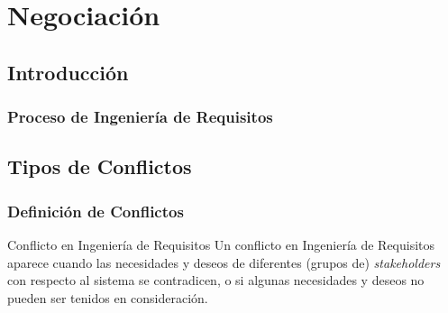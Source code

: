 \documentclass[handout,a4paper,slidestop,xcolor=pst,dvips,blue]{beamer}
\begin{document}
\section{Negociación}

\subsection{Introducción}

\begin{frame}
    \frametitle{Proceso de Ingeniería de Requisitos}
\end{frame}

\subsection{Tipos de Conflictos}

\begin{frame}[c]
    \frametitle{Definición de Conflictos}
    \begin{block}{Conflicto en Ingeniería de Requisitos}
        Un conflicto en Ingeniería de Requisitos aparece cuando las necesidades y deseos de diferentes (grupos de) \emph{stakeholders} con respecto al sistema se contradicen, o si algunas necesidades y deseos no pueden ser tenidos en consideración.
    \end{block}
\end{frame}
\end{document}
